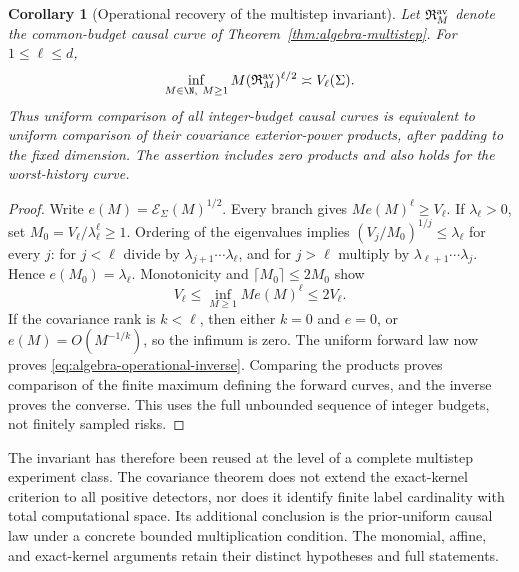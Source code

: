 \documentclass[11pt]{amsart}
\newtheorem{corollary}[theorem]{Corollary}
\theoremstyle{definition}\newtheorem{definition}[theorem]{Definition}
\theoremstyle{remark}\newtheorem{remark}[theorem]{Remark}
\begin{document}
\begin{corollary}[Operational recovery of the multistep invariant]
\label{cor:algebra-operational-inverse}
Let $\mathfrak R_M^{\rm av}$ denote the common-budget causal curve of
Theorem~\ref{thm:algebra-multistep}. For $1\le\ell\le d$,
\begin{equation}\label{eq:algebra-operational-inverse}
 \inf_{M\in\N,\ M\ge1}M(\mathfrak R_M^{\rm av})^{\ell/2}
                         \asymp V_\ell(\Sigma).
\end{equation}
Thus uniform comparison of all integer-budget causal curves is
equivalent to uniform comparison of their covariance exterior-power
products, after padding to the fixed dimension. The assertion includes
zero products and also holds for the worst-history curve.
\end{corollary}
\begin{proof}
Write $e(M)=\mathcal E_\Sigma(M)^{1/2}$. Every branch gives
$Me(M)^\ell\ge V_\ell$. If $\lambda_\ell>0$, set
$M_0=V_\ell/\lambda_\ell^\ell\ge1$. Ordering of the eigenvalues
implies $(V_j/M_0)^{1/j}\le\lambda_\ell$ for every $j$:
for $j<\ell$ divide by $\lambda_{j+1}\cdots\lambda_\ell$, and
for $j>\ell$ multiply by $\lambda_{\ell+1}\cdots\lambda_j$.
Hence $e(M_0)=\lambda_\ell$. Monotonicity and
$\lceil M_0\rceil\le2M_0$ show
\[
 V_\ell\le\inf_{M\ge1}Me(M)^\ell\le2V_\ell.
\]
If the covariance rank is $k<\ell$, then either $k=0$ and $e=0$,
or $e(M)=O(M^{-1/k})$, so the infimum is zero. The uniform forward
law now proves \eqref{eq:algebra-operational-inverse}. Comparing the
products proves comparison of the finite maximum defining the forward
curves, and the inverse proves the converse. This uses the full
unbounded sequence of integer budgets, not finitely sampled risks.
\end{proof}

The invariant has therefore been reused at the level of a complete
multistep experiment class. The covariance theorem does not extend the
exact-kernel criterion to all positive detectors, nor does it identify
finite label cardinality with total computational space. Its additional
conclusion is the prior-uniform causal law under a concrete bounded
multiplication condition. The monomial, affine, and exact-kernel
arguments retain their distinct hypotheses and full statements.

\appendix
\end{document}
